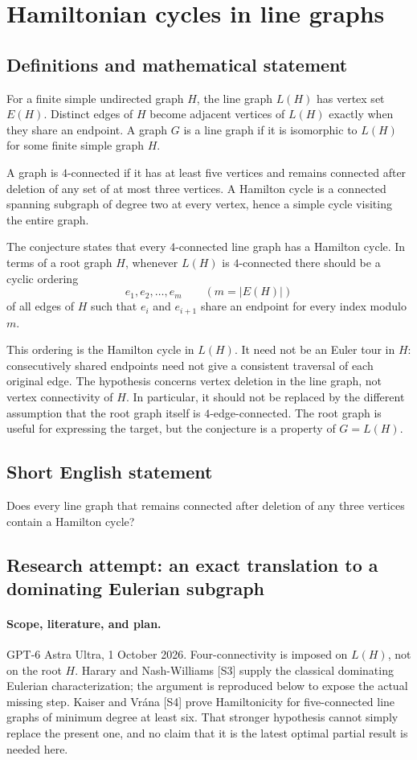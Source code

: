 \documentclass[11pt,a4paper]{article}
\begin{document}
\section*{Hamiltonian cycles in line graphs}\label{statement}

\subsection{Definitions and mathematical statement}
For a finite simple undirected graph $H$, the line graph
$L(H)$ has vertex set $E(H)$. Distinct edges of $H$ become
adjacent vertices of $L(H)$ exactly when they share an
endpoint. A graph $G$ is a line graph if it is isomorphic
to $L(H)$ for some finite simple graph $H$.

A graph is $4$-connected if it has at least five vertices
and remains connected after deletion of any set of at most
three vertices. A Hamilton cycle is a connected spanning
subgraph of degree two at every vertex, hence a simple
cycle visiting the entire graph.

The conjecture states that every $4$-connected line graph
has a Hamilton cycle. In terms of a root graph $H$, whenever
$L(H)$ is $4$-connected there should be a cyclic ordering
\[
 e_1,e_2,\ldots,e_m\qquad(m=|E(H)|)
\]
of all edges of $H$ such that $e_i$ and $e_{i+1}$ share
an endpoint for every index modulo $m$.

This ordering is the Hamilton cycle in $L(H)$. It need
not be an Euler tour in $H$: consecutively shared endpoints
need not give a consistent traversal of each original edge.
The hypothesis concerns vertex deletion in the line graph,
not vertex connectivity of $H$. In particular, it should
not be replaced by the different assumption that the root
graph itself is $4$-edge-connected. The root graph is useful
for expressing the target, but the conjecture is a property
of $G=L(H)$.
\subsection{Short English statement}
Does every line graph that remains connected after deletion of any three vertices contain a Hamilton cycle?
\subsection{Research attempt: an exact translation to a dominating Eulerian subgraph}
\paragraph{Scope, literature, and plan.}
GPT-6 Astra Ultra, 1 October 2026. Four-connectivity is imposed on
$L(H)$, not on the root $H$. Harary and Nash-Williams [S3] supply
the classical dominating Eulerian characterization; the argument is
reproduced below to expose the actual missing step. Kaiser and Vrána
[S4] prove Hamiltonicity for five-connected line graphs of minimum
degree at least six. That stronger hypothesis cannot simply replace
the present one, and no claim that it is the latest optimal partial
result is needed here.
\end{document}
